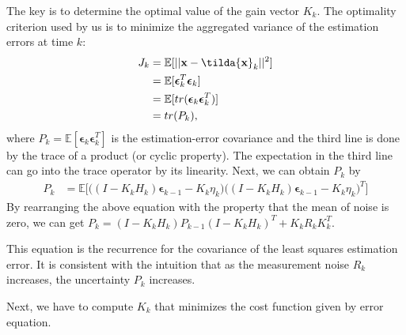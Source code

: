 The key is to determine the optimal value of the gain vector $K_k$. The optimality criterion used by us is to minimize the aggregated variance of the estimation errors at time $k$: 
\begin{align*}
	J_k &= \mathbb{E}[||\rvx-\tilda{\rvx}_k||^2]\\
		&= \mathbb{E}[\boldsymbol{\epsilon}_{k}^T\boldsymbol{\epsilon}_{k}]\\
		&= \mathbb{E}[tr(\boldsymbol{\epsilon}_{k}\boldsymbol{\epsilon}_{k}^T)]\\
		&= tr(P_k),
\end{align*}
where $P_k=\mathbb{E}[\boldsymbol{\epsilon}_{k}\boldsymbol{\epsilon}_{k}^T]$ is the estimation-error covariance and the third line is done by the trace of a product (or cyclic property). The expectation in the third line can go into the trace operator by its linearity. Next, we can obtain $P_k$ by
\begin{align*}
	P_k &= \mathbb{E}\bigg[\big((I-K_k H_k)\boldsymbol{\epsilon}_{k-1}-K_k\eta_k\big)\big((I-K_k H_k)\boldsymbol{\epsilon}_{k-1}-K_k\eta_k\big)^T\bigg]
\end{align*}
By rearranging the above equation with the property that the mean of noise is zero, we can get
$P_k = (I-K_k H_k)P_{k-1}(I-K_k H_k)^T+K_kR_kK_k^T.$

This equation is the recurrence for the covariance of the least squares estimation error. It is consistent with the intuition that as the measurement noise $R_k$ increases, the uncertainty $P_k$ increases. 

Next, we have to compute $K_k$ that minimizes the cost function given by error equation. 







